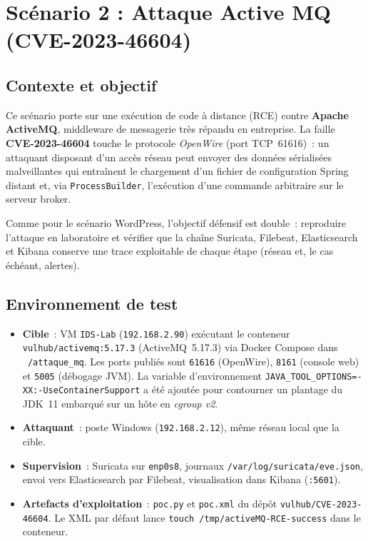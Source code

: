 \documentclass[12pt]{article}
\begin{document}
\section{Scénario 2 : Attaque Active MQ (CVE-2023-46604)}\label{sec:Q2}

\subsection{Contexte et objectif}

Ce scénario porte sur une exécution de code à distance (RCE) contre
\textbf{Apache ActiveMQ}, middleware de messagerie très répandu en entreprise.
La faille \textbf{CVE-2023-46604} touche le protocole \textit{OpenWire} (port
TCP~61616)~: un attaquant disposant d'un accès réseau peut envoyer des données
sérialisées malveillantes qui entraînent le chargement d'un fichier de
configuration Spring distant et, via \texttt{ProcessBuilder}, l'exécution d'une
commande arbitraire sur le serveur broker.

Comme pour le scénario WordPress, l'objectif défensif est double~: reproduire
l'attaque en laboratoire et vérifier que la chaîne Suricata, Filebeat,
Elasticsearch et Kibana conserve une trace exploitable de chaque étape
(réseau et, le cas échéant, alertes).

\subsection{Environnement de test}

\begin{itemize}[nosep]
  \item \textbf{Cible}~: VM \texttt{IDS-Lab} (\texttt{192.168.2.90}) exécutant
        le conteneur \texttt{vulhub/activemq:5.17.3} (ActiveMQ~5.17.3) via
        Docker Compose dans \texttt{~/attaque\_mq}. Les ports publiés sont
        \texttt{61616} (OpenWire), \texttt{8161} (console web) et
        \texttt{5005} (débogage JVM). La variable d'environnement
        \texttt{JAVA\_TOOL\_OPTIONS=-XX:-UseContainerSupport} a été ajoutée
        pour contourner un plantage du JDK~11 embarqué sur un hôte en
        \textit{cgroup v2}.
  \item \textbf{Attaquant}~: poste Windows (\texttt{192.168.2.12}), même réseau
        local que la cible.
  \item \textbf{Supervision}~: Suricata sur \texttt{enp0s8},
        journaux \texttt{/var/log/suricata/eve.json}, envoi vers Elasticsearch
        par Filebeat, visualisation dans Kibana (\texttt{:5601}).
  \item \textbf{Artefacts d'exploitation}~: \texttt{poc.py} et \texttt{poc.xml}
        du dépôt \texttt{vulhub/CVE-2023-46604}. Le XML par défaut lance
        \texttt{touch /tmp/activeMQ-RCE-success} dans le conteneur.
\end{itemize}
\end{document}
